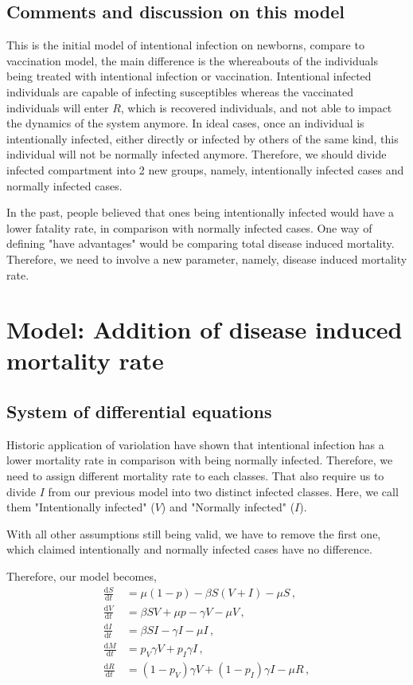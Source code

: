 \documentclass[12pt]{article}
\newcommand\dbyd[2]{\frac{\mathrm d{#1}}{\mathrm d{#2}}}
\newcommand{\pmV}{p_{V}}
\newcommand{\pmI}{p_{I}}
\begin{document}
\subsection{Comments and discussion on this model}
This is the initial model of intentional infection on newborns, compare to vaccination model, the main difference is the whereabouts of the individuals being treated with intentional infection or vaccination. Intentional infected individuals are capable of infecting susceptibles whereas the vaccinated individuals will enter $R$, which is recovered individuals, and not able to impact the dynamics of the system anymore. In ideal cases, once an individual is intentionally infected, either directly or infected by others of the same kind, this individual will not be normally infected anymore. Therefore, we should divide infected compartment into 2 new groups, namely, intentionally infected cases and normally infected cases.

In the past, people believed that ones being intentionally infected would have a lower fatality rate, in comparison with normally infected cases. One way of defining "have advantages" would be comparing total disease induced mortality. Therefore, we need to involve a new parameter, namely, disease induced mortality rate.

\section{Model: Addition of disease induced mortality rate}
\subsection{System of differential equations}
Historic application of variolation have shown that intentional infection has a lower mortality rate in comparison with being normally infected. Therefore, we need to assign different mortality rate to each classes. That also require us to divide $I$ from our previous model into two distinct infected classes. Here, we call them "Intentionally infected" ($V$) and "Normally infected" ($I$). 

With all other assumptions still being valid, we have to remove the first one, which claimed intentionally and normally infected cases have no difference.

Therefore, our model becomes,
\begin{equation}\label{2}
\begin{split}
\dbyd{S}{t}&=\mu(1-p)- \beta S(V+I)-\mu S \,,\\
\dbyd{V}{t}&=\beta SV+\mu p-\gamma V -\mu V\,,\\
\dbyd{I}{t}&=\beta SI-\gamma I -\mu I\,,\\
\dbyd{M}{t}&=\pmV\gamma V+\pmI\gamma I\,,\\
\dbyd{R}{t}&=(1-\pmV)\gamma V+(1-\pmI)\gamma I-\mu R\,,
\end{split}
\end{equation}
\end{document}

